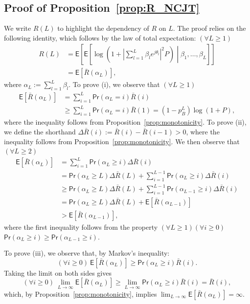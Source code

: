 \documentclass[10pt,journal,a4paper]{IEEEtran}
\newcommand{\eqdef}{:=}
\newcommand{\E}{\mathsf{E}}		%
\renewcommand{\P}{\mathsf{Pr}} 			%
\begin{document}
\subsection{Proof of Proposition~\ref{prop:R_NCJT}}
\label{app:R_NCJT}
We write $R(L)$ to highlight the dependency of $R$ on $L$. The proof relies on the following identity, which follows by the law of total expectation: $(\forall L\geq 1)$
\begin{align*}
R(L) &= \E\left[\E\left[\log\left(1+\left|\textstyle\sum_{l=1}^L\beta_le^{j\theta_l}\right|^2P\right)\middle|\beta_1,\ldots,\beta_L\right]\right] \\
&= \E[\bar{R}(\alpha_L)], 
\end{align*}
where $\alpha_L \eqdef \sum_{l=1}^L\beta_l$. To prove (i), we observe that $(\forall L\geq 1)$
\begin{align*}
\E[\bar{R}(\alpha_L)] &=\sum_{i = 1}^L\P(\alpha_L = i)\bar{R}(i)\\
&\geq \sum_{i=1}^L\P(\alpha_L=i)\bar{R}(1) = (1-p_B^L)\log(1+P), 
\end{align*}
where the inequality follows from Proposition~\ref{prop:monotonicity}. To prove (ii), we define the shorthand $\Delta\bar{R}(i)\eqdef \bar{R}(i)-\bar{R}(i-1)>0$, where the inequality follows from Proposition~\ref{prop:monotonicity}. We then observe that $(\forall L\geq 2)$
\begin{align*}
\E[\bar{R}(\alpha_L)] &= \sum_{i = 1}^L\P(\alpha_L \geq i)\Delta\bar{R}(i) \\
&= \P(\alpha_L \geq L)\Delta\bar{R}(L)+\sum_{i = 1}^{L-1}\P(\alpha_L \geq i)\Delta\bar{R}(i)\\
&\geq \P(\alpha_L \geq L)\Delta\bar{R}(L)+\sum_{i=1}^{L-1}\P(\alpha_{L-1} \geq i)\Delta\bar{R}(i) \\
&= \P(\alpha_L \geq L)\Delta\bar{R}(L)+\E[\bar{R}(\alpha_{L-1})] \\
&>\E[\bar{R}(\alpha_{L-1})],
\end{align*}
where the first inequality follows from the property $(\forall L \geq 1)(\forall i \geq 0)$ $\P(\alpha_L\geq i) \geq \P(\alpha_{L-1} \geq i)$. 

To prove (iii), we observe that, by Markov's inequality:
\begin{equation*}
(\forall i \geq 0)~\E[\bar{R}(\alpha_L)] \geq \P(\alpha_L \geq i)\bar{R}(i).
\end{equation*}
Taking the limit on both sides gives
\begin{equation*}
(\forall i\geq 0)~\lim_{L\to \infty}\E[\bar{R}(\alpha_L)] \geq \lim_{L\to \infty}\P(\alpha_L\geq i)\bar{R}(i) = \bar{R}(i),
\end{equation*}
which, by Proposition~\ref{prop:monotonicity}, implies $\lim_{L\to \infty}\E[\bar{R}(\alpha_L)]= \infty$.
\end{document}
